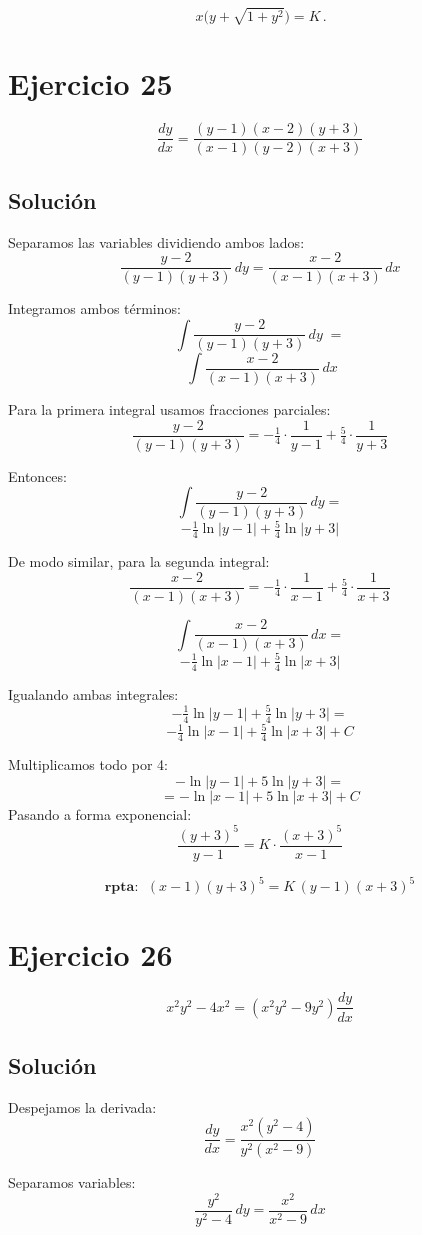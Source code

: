 \documentclass[12pt,a4paper]{article}
\begin{document}
\begin{multicols}{2}
	\[
	\boxed{\,x\bigl(y+\sqrt{1+y^{2}}\bigr)=K\,}.
	\]


\section*{Ejercicio 25}
\[
\frac{dy}{dx} = \frac{(y-1)(x-2)(y+3)}{(x-1)(y-2)(x+3)}
\]

\subsection*{Solución}
Separamos las variables dividiendo ambos lados:
\[
\frac{y-2}{(y-1)(y+3)}\,dy = \frac{x-2}{(x-1)(x+3)}\,dx
\]

Integramos ambos términos:
\[
\int \frac{y-2}{(y-1)(y+3)}\,dy \;=
\]
\[
\;\int \frac{x-2}{(x-1)(x+3)}\,dx
\]

Para la primera integral usamos fracciones parciales:
\[
\frac{y-2}{(y-1)(y+3)} = -\tfrac{1}{4}\cdot\frac{1}{y-1} + \tfrac{5}{4}\cdot\frac{1}{y+3}
\]

Entonces:
\[
\int \frac{y-2}{(y-1)(y+3)}\,dy
=
\]
\[
-\tfrac{1}{4}\ln|y-1|+\tfrac{5}{4}\ln|y+3|
\]

De modo similar, para la segunda integral:
\[
\frac{x-2}{(x-1)(x+3)} = -\tfrac{1}{4}\cdot\frac{1}{x-1} + \tfrac{5}{4}\cdot\frac{1}{x+3}
\]

\[
\int \frac{x-2}{(x-1)(x+3)}\,dx
= \]
\[
-\tfrac{1}{4}\ln|x-1|+\tfrac{5}{4}\ln|x+3|
\]

Igualando ambas integrales:
\[
-\tfrac{1}{4}\ln|y-1|+\tfrac{5}{4}\ln|y+3|
=\] \[-\tfrac{1}{4}\ln|x-1|+\tfrac{5}{4}\ln|x+3|+C
\]

Multiplicamos todo por 4:
\[
-\ln|y-1|+5\ln|y+3| = 
\]
\[=-\ln|x-1|+5\ln|x+3|+C\]
Pasando a forma exponencial:
\[
\frac{(y+3)^5}{y-1} = K \cdot \frac{(x+3)^5}{x-1}
\]

\[
\textbf{rpta: } \; (x-1)(y+3)^5 = K\,(y-1)(x+3)^5
\]
\section*{Ejercicio 26}
\[
x^2y^2 - 4x^2 = (x^2y^2 - 9y^2)\frac{dy}{dx}
\]

\subsection*{Solución}
Despejamos la derivada:
\[
\frac{dy}{dx} = \frac{x^2(y^2-4)}{y^2(x^2-9)}
\]

Separamos variables:
\[
\frac{y^2}{y^2-4}\,dy = \frac{x^2}{x^2-9}\,dx
\]


\end{multicols}
\end{document}
